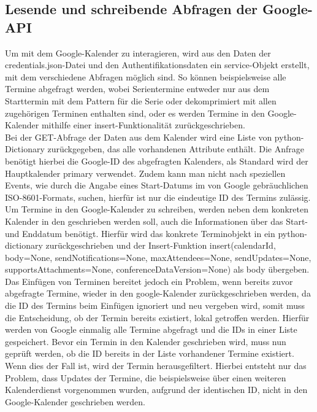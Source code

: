 \subsection{Lesende und schreibende Abfragen der Google-API}
Um mit dem Google-Kalender zu interagieren, wird aus den Daten der credentials.json-Datei und den Authentifikationsdaten ein service-Objekt erstellt, mit dem verschiedene Abfragen möglich sind. So können beispielsweise alle Termine abgefragt werden, wobei Serientermine entweder nur aus dem Starttermin mit dem Pattern für die Serie oder dekomprimiert mit allen zugehörigen Terminen enthalten sind, oder es werden Termine in den Google-Kalender mithilfe einer insert-Funktionalität zurückgeschrieben. \\
Bei der GET-Abfrage der Daten aus dem Kalender wird eine Liste von python-Dictionary zurückgegeben, das alle vorhandenen Attribute enthält. Die Anfrage benötigt hierbei die Google-ID des abgefragten Kalenders, als Standard wird der Hauptkalender \glqq primary \grqq verwendet. Zudem kann man nicht nach speziellen Events, wie durch die Angabe eines Start-Datums im von Google gebräuchlichen ISO-8601-Formats, suchen, hierfür ist nur die eindeutige ID des Termins zulässig. \\
Um Termine in den Google-Kalender zu schreiben, werden neben dem konkreten Kalender in den geschrieben werden soll, auch die Informationen über das Start- und Enddatum benötigt. Hierfür wird das konkrete Terminobjekt in ein python-dictionary zurückgeschrieben und der Insert-Funktion \glqq insert(calendarId, body=None, sendNotifications=None, maxAttendees=None, sendUpdates=None, supportsAttachments=None, conferenceDataVersion=None)\grqq{} als \glqq body\grqq{} übergeben. Das Einfügen von Terminen bereitet jedoch ein Problem, wenn bereits zuvor abgefragte Termine, wieder in den google-Kalender zurückgeschrieben werden, da die ID des Termins beim Einfügen ignoriert und neu vergeben wird, somit muss die Entscheidung, ob der Termin bereits existiert, lokal getroffen werden. Hierfür werden von Google einmalig alle Termine abgefragt und die IDs in einer Liste gespeichert. Bevor ein Termin in den Kalender geschrieben wird, muss nun geprüft werden, ob die ID bereits in der Liste vorhandener Termine existiert. Wenn dies der Fall ist, wird der Termin herausgefiltert. Hierbei entsteht nur das Problem, dass Updates der Termine, die beispielsweise über einen weiteren Kalenderdienst vorgenommen wurden, aufgrund der identischen ID, nicht in den Google-Kalender geschrieben werden. \\
